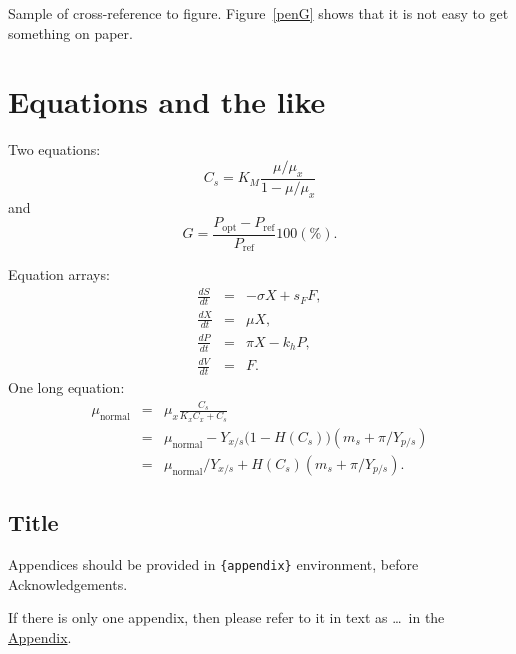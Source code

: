 \documentclass[aos,preprint]{imsart}
\theoremstyle{remark}
\begin{document}
Sample of cross-reference to figure.
Figure~\ref{penG} shows that it is not easy to get something on paper.

\section{Equations and the like}

Two equations:
\begin{equation}
    C_{s}  =  K_{M} \frac{\mu/\mu_{x}}{1-\mu/\mu_{x}} \label{ccs}
\end{equation}
and
\begin{equation}
    G = \frac{P_{\mathrm{opt}} - P_{\mathrm{ref}}}{P_{\mathrm{ref}}}  100(\%).
\end{equation}

Equation arrays:
\begin{eqnarray}
  \frac{dS}{dt} & = & - \sigma X + s_{F} F,\\
  \frac{dX}{dt} & = &   \mu    X,\\
  \frac{dP}{dt} & = &   \pi    X - k_{h} P,\\
  \frac{dV}{dt} & = &   F.
\end{eqnarray}
One long equation:
\begin{eqnarray}
 \mu_{\text{normal}} & = & \mu_{x} \frac{C_{s}}{K_{x}C_{x}+C_{s}}  \nonumber\\
                     & = & \mu_{\text{normal}} - Y_{x/s}\bigl(1-H(C_{s})\bigr)(m_{s}+\pi /Y_{p/s})\\
                     & = & \mu_{\text{normal}}/Y_{x/s}+ H(C_{s}) (m_{s}+ \pi /Y_{p/s}).\nonumber
\end{eqnarray}
\begin{appendix}
\section*{Title}\label{appn} %
Appendices should be provided in \verb|{appendix}| environment,
before Acknowledgements.

If there is only one appendix,
then please refer to it in text as \ldots\ in the \hyperref[appn]{Appendix}.
\end{appendix}
\end{document}
